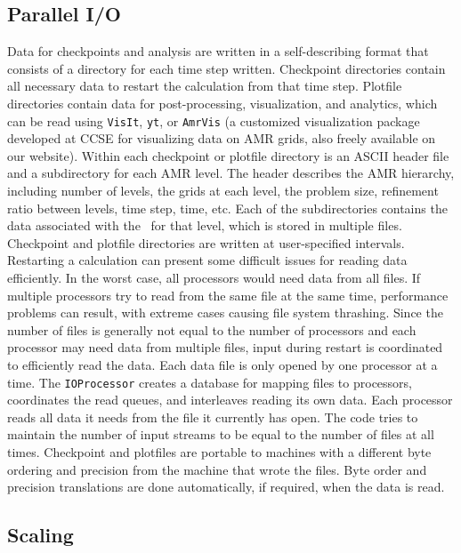 \subsection{Parallel I/O}

Data for checkpoints and analysis are written in a self-describing format that consists 
of a directory for each time step written. Checkpoint directories contain all necessary 
data to restart the calculation from that time step. Plotfile directories contain data 
for post-processing, visualization, and analytics, which can be read using {\tt VisIt}, 
{\tt yt}, or {\tt AmrVis} (a customized visualization package developed at CCSE for 
visualizing data on AMR grids, also freely available on our website).  Within each 
checkpoint or plotfile directory is an ASCII header file and a
subdirectory for each AMR level.  The header describes the AMR hierarchy, including 
number of levels, the grids at each level, the problem size, refinement ratio 
between levels, time step, time, etc.  Each of the subdirectories contains the data 
associated with the \MultiFab\ for that level, which is stored in multiple files.
Checkpoint and plotfile directories are written at user-specified intervals.\\

Restarting a calculation can present some difficult issues for reading data efficiently. 
In the worst case, all processors would need data from all files. If multiple processors 
try to read from the same file at the same time, performance problems can result, with 
extreme cases causing file system thrashing.  Since the number of files is generally not 
equal to the number of processors and each processor may need data from multiple files, 
input during restart is coordinated to efficiently read the data. Each data file is only 
opened by one processor at a time. The {\tt IOProcessor} creates a database for mapping files 
to processors, coordinates the read queues, and interleaves reading its own data.  Each 
processor reads all data it needs from the file it currently has open.  The code tries to 
maintain the number of input streams to be equal to the number of files at all times. 
Checkpoint and plotfiles are portable to machines with a different byte ordering and 
precision from the machine that wrote the files.  Byte order and precision translations 
are done automatically, if required, when the data is read.

\subsection{Scaling}

